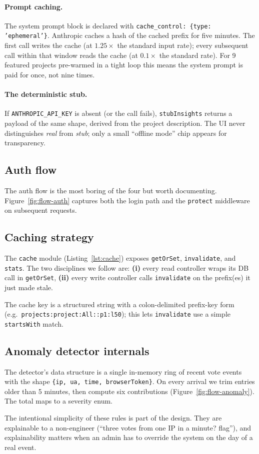 \paragraph{Prompt caching.} The system prompt block is declared with
\texttt{cache\_control: \{type: 'ephemeral'\}}. Anthropic caches a hash
of the cached prefix for five minutes. The first call writes the cache
(at $1.25\times$ the standard input rate); every subsequent call within
that window reads the cache (at $0.1\times$ the standard rate). For 9
featured projects pre-warmed in a tight loop this means the system
prompt is paid for once, not nine times.

\paragraph{The deterministic stub.} If \texttt{ANTHROPIC\_API\_KEY} is
absent (or the call fails), \texttt{stubInsights} returns a payload of
the same shape, derived from the project description. The UI never
distinguishes \emph{real} from \emph{stub}; only a small ``offline mode''
chip appears for transparency.

\subsection{Auth flow}

The auth flow is the most boring of the four but worth documenting.
Figure~\ref{fig:flow-auth} captures both the login path and the
\texttt{protect} middleware on subsequent requests.


\subsection{Caching strategy}

The \texttt{cache} module (Listing~\ref{lst:cache}) exposes
\texttt{getOrSet}, \texttt{invalidate}, and \texttt{stats}. The two
disciplines we follow are: \textbf{(i)} every read controller wraps its
DB call in \texttt{getOrSet}, \textbf{(ii)} every write controller calls
\texttt{invalidate} on the prefix(es) it just made stale.

The cache key is a structured string with a colon-delimited
prefix-key form (e.g.\ \texttt{projects:project:All::p1:l50}); this lets
\texttt{invalidate} use a simple \texttt{startsWith} match.

\subsection{Anomaly detector internals}

The detector's data structure is a single in-memory ring of recent vote
events with the shape \texttt{\{ip, ua, time, browserToken\}}. On every
arrival we trim entries older than 5 minutes, then compute six
contributions (Figure~\ref{fig:flow-anomaly}). The total maps to a
severity enum.

The intentional simplicity of these rules is part of the design. They
are explainable to a non-engineer (``three votes from one IP in a
minute? flag''), and explainability matters when an admin has to
override the system on the day of a real event.
